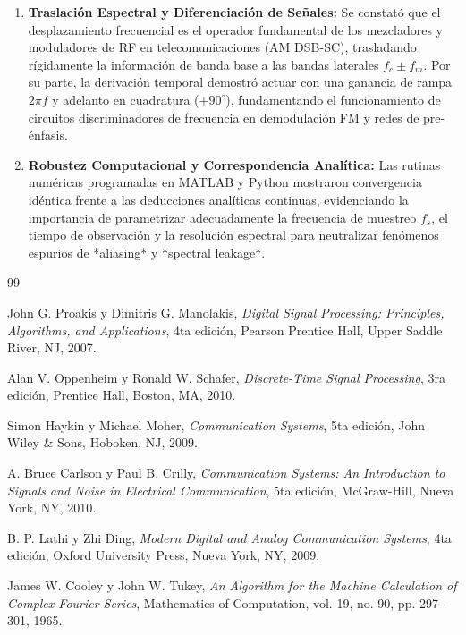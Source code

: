 \documentclass[11pt,a4paper]{article}
\begin{document}
\begin{enumerate}[label=\textbf{\arabic*.}]
  \item \textbf{Traslaci\'on Espectral y Diferenciaci\'on de Se\~nales:}
  Se constat\'o que el desplazamiento frecuencial es el operador fundamental de los mezcladores y moduladores de RF en telecomunicaciones (AM DSB-SC), trasladando r\'igidamente la informaci\'on de banda base a las bandas laterales $f_c \pm f_m$. Por su parte, la derivaci\'on temporal demostr\'o actuar con una ganancia de rampa $2\pi f$ y adelanto en cuadratura ($+90^\circ$), fundamentando el funcionamiento de circuitos discriminadores de frecuencia en demodulaci\'on FM y redes de pre-\'enfasis.

  \item \textbf{Robustez Computacional y Correspondencia Anal\'itica:}
  Las rutinas num\'ericas programadas en MATLAB y Python mostraron convergencia id\'entica frente a las deducciones anal\'iticas continuas, evidenciando la importancia de parametrizar adecuadamente la frecuencia de muestreo $f_s$, el tiempo de observaci\'on y la resoluci\'on espectral para neutralizar fen\'omenos espurios de *aliasing* y *spectral leakage*.
\end{enumerate}

\begin{thebibliography}{99}

John G. Proakis y Dimitris G. Manolakis,
\textit{Digital Signal Processing: Principles, Algorithms, and Applications},
4ta edici\'on, Pearson Prentice Hall, Upper Saddle River, NJ, 2007.

Alan V. Oppenheim y Ronald W. Schafer,
\textit{Discrete-Time Signal Processing},
3ra edici\'on, Prentice Hall, Boston, MA, 2010.

Simon Haykin y Michael Moher,
\textit{Communication Systems},
5ta edici\'on, John Wiley \& Sons, Hoboken, NJ, 2009.

A. Bruce Carlson y Paul B. Crilly,
\textit{Communication Systems: An Introduction to Signals and Noise in Electrical Communication},
5ta edici\'on, McGraw-Hill, Nueva York, NY, 2010.

B. P. Lathi y Zhi Ding,
\textit{Modern Digital and Analog Communication Systems},
4ta edici\'on, Oxford University Press, Nueva York, NY, 2009.

James W. Cooley y John W. Tukey,
\textit{An Algorithm for the Machine Calculation of Complex Fourier Series},
Mathematics of Computation, vol. 19, no. 90, pp. 297--301, 1965.

\end{thebibliography}
\end{document}
